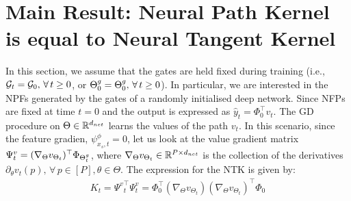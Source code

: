 \section{Main Result: Neural Path Kernel is equal to Neural Tangent Kernel}

In this section, we assume that the gates are held fixed during training (i.e., $\mathcal{G}_t=\mathcal{G}_0,\,\forall\, t\geq 0$, or ${\Theta}^g_0={\Theta}^g_0,\,\forall\,t\geq 0$). In particular, we are interested in the NPFs generated by the gates of a randomly initialised deep network. Since NFPs are fixed at time $t=0$ and the output is expressed as $\hat{y}_t=\Phi^\top_0 v_t$.  The GD procedure on $\Theta\in\mathbb{R}^{d_{net}}$ learns the values of the path $v_t$. In this scenario, since the feature gradien, $\psi^{\phi}_{x_s,t}=0$, let us look at the value gradient matrix $\Psi^v_t=(\nabla_{\Theta}v_{\Theta_t})^\top \Phi_{{\Theta}^g_t}$, where $\nabla_{\Theta}v_{\Theta_t}\in \mathbb{R}^{P\times d_{net}}$ is the collection of the derivatives $\partial_{\theta}v_t(p),\,\forall\,p\in[P],\theta\in\Theta$. The expression for the NTK is given by:
\begin{align}\label{eq:kt}
K_t={\Psi^v}^\top_t\Psi^v_t= \Phi^\top_0(\nabla_{\Theta}v_{\Theta_t})(\nabla_{\Theta}v_{\Theta_t})^\top \Phi_0
\end{align}

